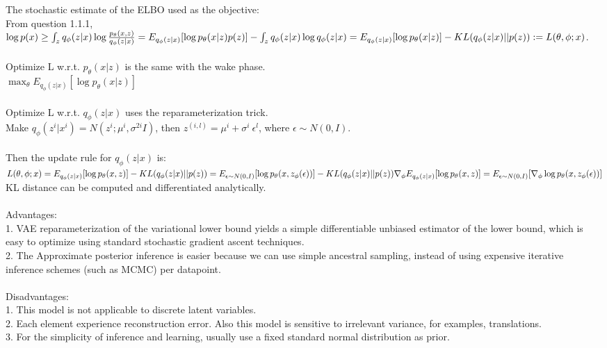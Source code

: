 \documentclass{article}
\begin{document}
\subsubsection{}
The stochastic estimate of the ELBO used as the objective: \\
From question 1.1.1, \\
$\log p(x) \ge \int_z q_{\phi}(z|x)\log\frac{p_{\theta}(x,z)}{q_{\phi}(z|x)}
= E_{q_{\phi}(z|x)}[\log p_{\theta}(x|z)p(z)] - \int_z q_{\phi}(z|x)\log q_{\phi}(z|x) \\
= E_{q_{\phi}(z|x)}[\log p_{\theta}(x|z)] - KL(q_{\phi}(z|x)||p(z)) := L(\theta, \phi; x)$. 
\\
\\
Optimize L w.r.t. $p_{\theta}(x|z)$ is the same with the wake phase.\\
$\max_{\theta}E_{q_{\phi}(z|x)}[\log p_{\theta}(x|z)]$
\\
\\
Optimize L w.r.t. $q_{\phi}(z|x)$ uses the reparameterization trick.\\
Make $q_{\phi}(z^i|x^i) = N(z^i; \mu^i, \sigma^{2i}I)$, then $z^{(i,l)} = \mu^{i} + \sigma^i\ \epsilon^l$, where $\epsilon \sim N(0, I)$. 
\\
\\
Then the update rule for $q_{\phi}(z|x)$ is:
\\
$
L(\theta, \phi; x) = E_{q_{\phi}(z|x)}[\log p_{\theta}(x,z)] - KL(q_{\phi}(z|x) || p(z)) \\
= E_{\epsilon\sim N(0, I)}[\log p_{\theta}(x, z_{\phi}(\epsilon))] - KL(q_{\phi}(z|x) || p(z)) \\
\\
\nabla_{\phi} E_{q_{\phi}(z|x)}[\log p_{\theta}(x,z)] = E_{\epsilon\sim N(0, I)}[\nabla_{\phi} \log p_{\theta}(x, z_{\phi}(\epsilon))]
$
\\
KL distance can be computed and differentiated analytically.
\\
\\
Advantages:\\
1. VAE reparameterization of the variational lower bound yields a simple differentiable unbiased estimator of the lower bound, which is easy to optimize using standard stochastic gradient ascent techniques. 
\\
2. The Approximate posterior inference is easier because we can use simple ancestral sampling, instead of using expensive iterative inference schemes (such as MCMC) per datapoint.
\\
\\
Disadvantages: \\
1. This model is not applicable to discrete latent variables. 
\\
2. Each element experience reconstruction error. Also this model is sensitive to irrelevant variance, for examples, translations.
\\
3. For the simplicity of inference and learning, usually use a fixed standard normal distribution as prior. 
\end{document}
